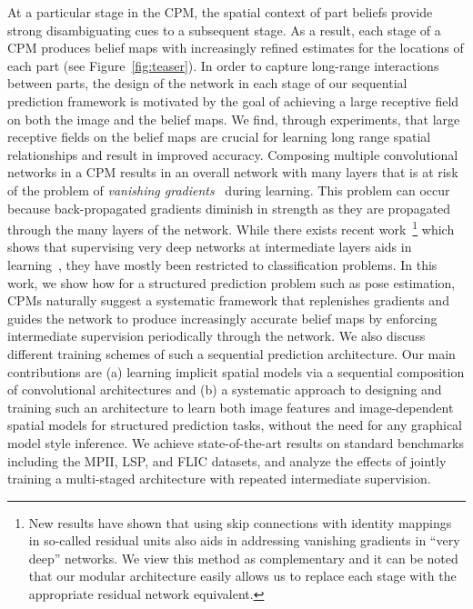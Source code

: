 \documentclass[10pt,twocolumn,letterpaper]{article}
\begin{document}
At a particular stage in the CPM, the spatial context of part beliefs provide strong disambiguating cues to a subsequent stage. As a result, each stage of a CPM produces belief maps with increasingly refined estimates for the locations of each part (see Figure~\ref{fig:teaser}). 
In order to capture long-range interactions between parts, the design of the network in each stage of our sequential prediction framework is motivated by the goal of achieving a large receptive field on both the image and the belief maps. We find, through experiments, that large receptive fields on the belief maps are crucial for learning long range spatial relationships and result in improved accuracy.
Composing multiple convolutional networks in a CPM results in an overall network with many layers that is at risk of the problem of
\emph{vanishing gradients}~\cite{hochreiter2001gradient,bradley2010learning,glorot2010understanding,bengio1994learning} during learning. 
This problem can occur because back-propagated gradients diminish in strength as they are propagated through the many layers of the network. 
While there exists recent work~\footnote{New results have shown that using skip connections with identity mappings~\cite{he15arxiv} in so-called residual units also aids in addressing vanishing gradients in ``very deep'' networks. We view this method as complementary and it can be noted that our modular architecture easily allows us to replace each stage with the appropriate residual network equivalent.} which shows that supervising very deep networks at intermediate layers aids in learning~\cite{lee2014deeply,szegedy2014going}, they have mostly been restricted to classification problems.
In this work, we show how for a structured prediction problem such as pose estimation, CPMs naturally suggest a systematic framework that replenishes gradients and guides the network to produce increasingly accurate belief maps  by enforcing intermediate supervision periodically through the network. We also discuss different training schemes of such a sequential prediction architecture. 
Our main contributions are (a) learning implicit spatial models via a sequential composition of convolutional architectures and (b) a systematic approach to designing and training such an architecture  to learn both image features and image-dependent spatial models for structured prediction tasks, without the need for any graphical model style inference. We achieve state-of-the-art results on standard benchmarks including the MPII, LSP, and FLIC datasets, and analyze the effects of jointly training a multi-staged architecture with repeated intermediate supervision.
\end{document}
